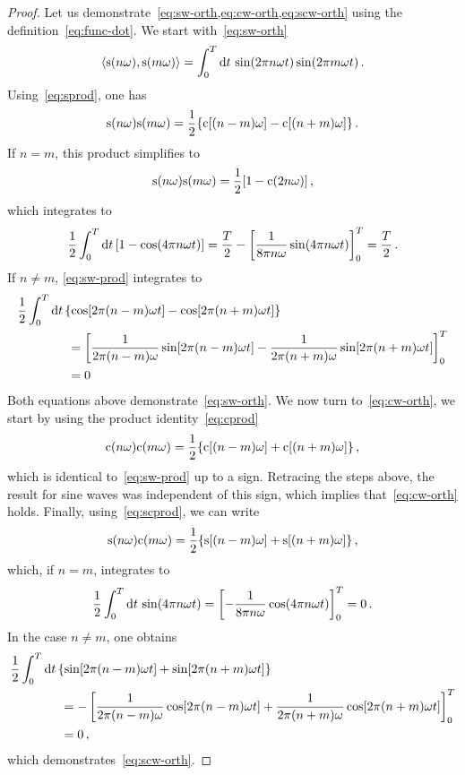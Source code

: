 \begin{proof}
  Let us demonstrate~\cref{eq:sw-orth,eq:cw-orth,eq:scw-orth} using the definition~\cref{eq:func-dot}. We start with~\cref{eq:sw-orth}
  \begin{equation}
    \braket{\mathrm{s}(n\omega),\mathrm{s}(m\omega)}=\int_{0}^{T}\mathrm{d} t\,\sin(2\pi n\omega t)\sin(2\pi m\omega t)\,.
  \end{equation}
  Using~\cref{eq:sprod}, one has
  \begin{equation}
    \mathrm{s}(n\omega)\mathrm{s}(m\omega)=\frac{1}{2}\{\mathrm{c}[(n-m)\omega]-\mathrm{c}[(n+m)\omega]\}\,.
    \label{eq:sw-prod}
  \end{equation}
  If $n=m$, this product simplifies to
  \begin{equation}
    \mathrm{s}(n\omega)\mathrm{s}(m\omega)=\frac{1}{2}[1-\mathrm{c}(2n\omega)]\,,
  \end{equation}
  which integrates to
  \begin{equation}
    \frac{1}{2}\int_{0}^{T}\mathrm{d} t\,[1-\cos(4\pi n\omega t)]=\frac{T}{2}-\left[\frac{1}{8\pi n\omega}\sin(4\pi n\omega t)\right]_0^T
    =\frac{T}{2}\,.
  \end{equation}
  If $n\neq m$, \cref{eq:sw-prod} integrates to
  \begin{align}
    &\frac{1}{2}\int_{0}^{T}\mathrm{d} t\,\{\cos[2\pi(n-m)\omega t]-\cos[2\pi(n+m)\omega t]\}\notag\\
    &\qquad\qquad=\left[\frac{1}{2\pi(n-m)\omega}\sin[2\pi(n-m)\omega t]-\frac{1}{2\pi(n+m)\omega}\sin[2\pi(n+m)\omega t]\right]_0^T\notag\\
    &\qquad\qquad=0
  \end{align}
  Both equations above demonstrate~\cref{eq:sw-orth}. We now turn to~\cref{eq:cw-orth}, we start by using the product identity~\cref{eq:cprod}
  \begin{equation}
    \mathrm{c}(n\omega)\mathrm{c}(m\omega)=\frac{1}{2}\{\mathrm{c}[(n-m)\omega]+\mathrm{c}[(n+m)\omega]\}\,,
  \end{equation}
  which is identical to~\cref{eq:sw-prod} up to a sign. Retracing the steps above, the result for sine waves was independent of this sign, which implies that~\cref{eq:cw-orth} holds. Finally, using~\cref{eq:scprod}, we can write
  \begin{equation}
    \mathrm{s}(n\omega)\mathrm{c}(m\omega)=\frac{1}{2}\{\mathrm{s}[(n-m)\omega]+\mathrm{s}[(n+m)\omega]\}\,,
  \end{equation}
  which, if $n=m$, integrates to
  \begin{equation}
    \frac{1}{2}\int_{0}^{T}\mathrm{d} t\,\sin(4\pi n\omega t)=\left[-\frac{1}{8\pi n\omega}\cos(4\pi n\omega t)\right]_0^T=0\,.
  \end{equation}
  In the case $n\neq m$, one obtains
  \begin{align}
    &\frac{1}{2}\int_{0}^{T}\mathrm{d} t\,\{\sin[2\pi(n-m)\omega t]+\sin[2\pi(n+m)\omega t]\}\notag\\
    &\qquad\qquad=-\left[\frac{1}{2\pi(n-m)\omega}\cos[2\pi(n-m)\omega t]+\frac{1}{2\pi(n+m)\omega}\cos[2\pi(n+m)\omega t]\right]_0^T\notag\\
    &\qquad\qquad=0\,,
  \end{align}
  which demonstrates~\cref{eq:scw-orth}.
\end{proof}
